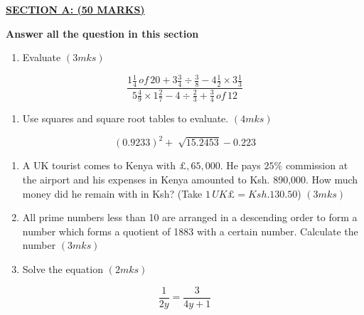 \documentclass[
  a4paperpaper,
]{scrbook}
\providecommand{\tightlist}{%
  \setlength{\itemsep}{0pt}\setlength{\parskip}{0pt}}\usepackage{longtable,booktabs,array}
\begin{document}
\begin{tcolorbox}[enhanced jigsaw, left=2mm, colframe=quarto-callout-note-color-frame, toptitle=1mm, opacitybacktitle=0.6, rightrule=.15mm, colbacktitle=quarto-callout-note-color!10!white, colback=white, arc=.35mm, breakable, leftrule=.75mm, bottomtitle=1mm, bottomrule=.15mm, title=\textcolor{quarto-callout-note-color}{\faInfo}\hspace{0.5em}{Model Sample Paper 7}, titlerule=0mm, coltitle=black, toprule=.15mm, opacityback=0]

\ul{\textbf{SECTION A: (50 MARKS)}}

\textbf{Answer all the question in this section}

\begin{enumerate}
\def\labelenumi{\arabic{enumi}.}
\tightlist
\item
  Evaluate \((3mks)\)
\end{enumerate}

\[\frac{1\frac{1}{4}\,of\,20+3\frac{3}{4}\div \frac{3}{8}-4\frac{1}{2}\times3\frac{1}{3}}{5\frac{4}{9}\times1\frac{2}{7}-4\div \frac{2}{3}+\frac{3}{4}\,of\,12}\]

\begin{enumerate}
\def\labelenumi{\arabic{enumi}.}
\setcounter{enumi}{1}
\tightlist
\item
  Use squares and square root tables to evaluate. \((4mks)\)
\end{enumerate}

\[ (0.9233)^2+\sqrt[]{15.2453}-0.223\]

\begin{enumerate}
\def\labelenumi{\arabic{enumi}.}
\setcounter{enumi}{2}
\item
  A UK tourist comes to Kenya with \(\pounds, 65, 000\). He pays
  \(25\%\) commission at the airport and his expenses in Kenya amounted
  to Ksh. 890,000. How much money did he remain with in Ksh? (Take
  \(1\, UK \pounds = Ksh. 130.50\)) \((3mks)\)
\item
  All prime numbers less than 10 are arranged in a descending order to
  form a number which forms a quotient of 1883 with a certain number.
  Calculate the number \((3mks)\)
\item
  Solve the equation \((2mks)\)
\end{enumerate}

\[\frac{1}{2y}=\frac{3}{4y+1}\]


\end{tcolorbox}
\end{document}
